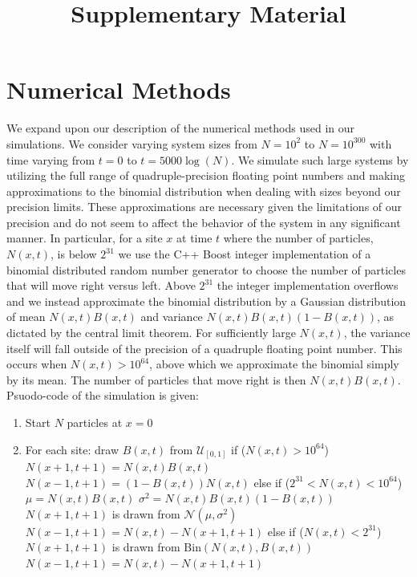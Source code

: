 \documentclass[letter,reqno, 11pt, oneside]{amsart}
\begin{document}
\title{Supplementary Material}
\maketitle

\section{Numerical Methods}
\label{sec:Numerical}
We expand upon our description of the numerical methods used in our simulations. We consider varying system sizes from  $N=10^2$ to $N=10^{300}$ with time varying from $t=0$ to $t= 5000 \log(N)$. We simulate such large systems by utilizing the full range of quadruple-precision floating point numbers and making approximations to the binomial distribution when dealing with sizes beyond our precision limits. These approximations are necessary given the limitations of our precision and do not seem to affect the behavior of the system in any significant manner. In particular, for a site $x$ at time $t$ where the number of particles, $N(x,t)$, is below $2^{31}$ we use the C++ Boost integer implementation of a binomial distributed random number generator to choose the number of particles that will move right versus left. Above $2^{31}$ the integer implementation overflows and we instead  approximate the binomial distribution by a Gaussian distribution of mean $N(x,t) B(x,t)$ and variance $N(x,t)  B(x,t) (1 - B(x,t))$, as dictated by the central limit theorem. For sufficiently large $N(x,t)$, the variance itself will fall outside of the precision of a quadruple floating point number. This occurs when $N(x,t) > 10^{64}$, above which we approximate the binomial simply by its mean. The number of particles that move right is then $N(x,t) B(x,t)$. Psuodo-code of the simulation is given:

\begin{enumerate}
 \item Start $N$ particles at $x=0$
 \item For each site:
  \subitem draw $B(x,t)$ from $\mathcal{U}_{[0, 1]}$
  \subitem if ($N(x, t) > 10^{64}$)
   \subsubitem $N(x+1, t+1) = N(x, t)B(x,t)$
   \subsubitem $N(x-1, t+1) = (1-B(x,t))N(x,t)$
  \subitem else if ($2^{31} < N(x, t) < 10^{64}$)
   \subsubitem $\mu = N(x,t)B(x,t)$
   \subsubitem $\sigma^2 = N(x,t)B(x,t)(1-B(x,t))$
   \subsubitem $N(x+1, t+1)$ is drawn from $\mathcal{N}(\mu, \sigma^2)$
   \subsubitem $N(x-1, t+1) = N(x, t) - N(x+1, t+1)$
  \subitem else if ($N(x, t) < 2^{31}$)
   \subsubitem $N(x+1, t+1)$ is drawn from $\mathrm{Bin}(N(x,t), B(x,t))$
   \subsubitem $N(x-1, t+1) = N(x,t) - N(x+1, t+1)$
\end{enumerate}
\end{document}
